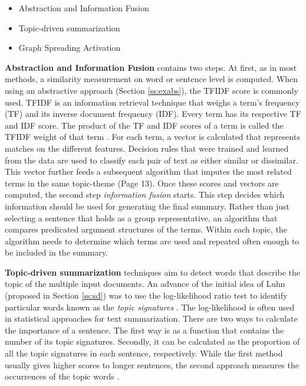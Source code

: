 \begin{itemize}
	\item Abstraction and Information Fusion
	\item Topic-driven summarization
	\item Graph Spreading Activation
\end{itemize}

\textbf{Abstraction and Information Fusion} contains two steps. At first, as in most methods, a similarity measurement on word or sentence level is computed. When using an abstractive approach (Section \ref{ss:exabs}), the TFIDF score is commonly used. TFIDF is an information retrieval technique that weighs a term’s frequency (TF) and its inverse document frequency (IDF). Every term has its respective TF and IDF score. The product of the TF and IDF scores of a term is called the TFIDF weight of that term \cite{Ramos_usingtf-idf}. For each term, a vector is calculated that represents matches on the different features. Decision rules that were trained and learned from the data are used to classify each pair of text as either similar or dissimilar. This vector further feeds a subsequent algorithm that imputes the most related terms in the same topic-theme \cite{Das07asurvey} (Page 13). Once these scores and vectors are computed, the second step \textit{information fusion} starts. This step decides which information should be used for generating the final summary. Rather than just selecting a sentence that holds as a group representative, an algorithm that compares predicated argument structures of the terms. Within each topic, the algorithm needs to determine which terms are used and repeated often enough to be included in the summary.

\textbf{Topic-driven summarization} techniques aim to detect words that describe the topic of the multiple input documents. An advance of the initial idea of Luhn (proposed in Section \ref{ss:sd}) was to use the log-likelihood ratio test to identify particular words known as the \textit{topic signatures} \cite{textmining1958}. The log-likelihood is often used in statistical approaches for text summarization. 
There are two ways to calculate the importance of a sentence. The first way is as a function that contains the number of its topic signatures. Secondly, it can be calculated as the proportion of all the topic signatures in each sentence, respectively. While the first method usually gives higher scores to longer sentences, the second approach measures the occurrences of the topic words \cite{dunning-1993-accurate}.

